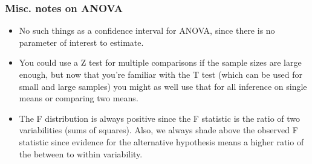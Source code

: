 \documentclass[slidestop,compress,mathserif]{beamer}
\begin{document}
\begin{frame}
\frametitle{Misc. notes on ANOVA}

\begin{itemize}

\item No such things as a confidence interval for ANOVA, since there is no parameter of interest to estimate.

\item You could use a Z test for multiple comparisons if the sample sizes are large enough, but now that you're familiar with the T test (which can be used for small and large samples) you might as well use that for all inference on single means or comparing two means.

\item The F distribution is always positive since the F statistic is the ratio of two variabilities (sums of squares). Also, we always shade above the observed F statistic since evidence for the alternative hypothesis means a higher ratio of the between to within variability.

\end{itemize}

\end{frame}

\end{document}
